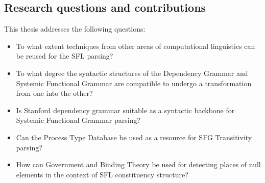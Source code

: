 \subsection{Research questions and contributions} %
This thesis addresses the following questions:
\begin{itemize}
    \item To what extent techniques from other areas of computational linguistics can be reused for the SFL parsing? 
    \item To what degree the syntactic structures of the Dependency Grammar and Systemic Functional Grammar are compatible to undergo a transformation from one into the other?
    \item Is Stanford dependency grammar suitable as a syntactic backbone for Systemic Functional Grammar parsing?
    
    \item Can the Process Type Database be used as a resource for SFG Transitivity parsing?
    \item How can Government and Binding Theory be used for detecting places of null elements in the context of SFL constituency structure?
    
\end{itemize}

